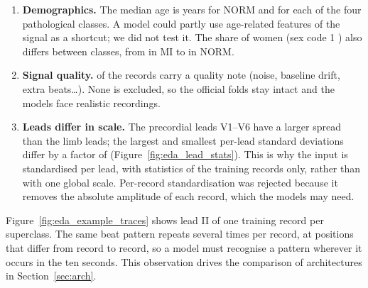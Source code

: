 \begin{enumerate}[leftmargin=1.4em,itemsep=2pt]
        patient in training and test; the patient-wise folds avoid it, and the bootstrap of the
        evaluation resamples patients for the same reason (Section~\ref{sec:framework}).
  \item \textbf{Demographics.} The median age is \intval{\edaAgeMedianNORM}{} years for NORM and
        \intval{\edaAgeMedianMI}{} for each of the four pathological classes. A model could partly use
        age-related features of the signal as a shortcut; we did not test it. The share of women
        (sex code 1 \cite[p.~6]{wagner2020ptbxl}) also differs between classes, from
        \edaFracSexOneMIPct{} in MI to \edaFracSexOneNORMPct{} in NORM.
  \item \textbf{Signal quality.} \edaFracAnyQualityFlagAllPct{} of the records carry a quality note
        (noise, baseline drift, extra beats\ldots). None is excluded, so the official folds stay
        intact and the models face realistic recordings.
  \item \textbf{Leads differ in scale.} The precordial leads V1--V6 have a larger spread than the limb
        leads; the largest and smallest per-lead standard deviations differ by a factor of
        \edaLeadStdRatioMaxMin{} (Figure~\ref{fig:eda_lead_stats}). This is why the input is
        standardised per lead, with statistics of the training records only, rather than with one
        global scale. Per-record standardisation was rejected because it removes the absolute
        amplitude of each record, which the models may need.
\end{enumerate}





Figure~\ref{fig:eda_example_traces} shows lead II of one training record per superclass. The same
beat pattern repeats several times per record, at positions that differ from record to record, so a model
must recognise a pattern wherever it occurs in the ten seconds. This observation drives the comparison
of architectures in Section~\ref{sec:arch}.


